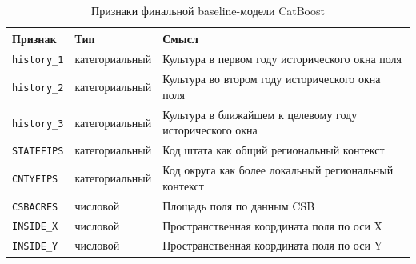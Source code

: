 \begin{table}[htbp]
\centering
\small
\caption{Признаки финальной baseline-модели CatBoost}
\label{tab:practice-final-features}
\begin{tabularx}{0.96\textwidth}{L{0.22\textwidth} L{0.18\textwidth} X}
\toprule
Признак & Тип & Смысл \\
\midrule
\texttt{history\_1} & категориальный & Культура в первом году исторического окна поля \\
\texttt{history\_2} & категориальный & Культура во втором году исторического окна поля \\
\texttt{history\_3} & категориальный & Культура в ближайшем к целевому году исторического окна \\
\texttt{STATEFIPS} & категориальный & Код штата как общий региональный контекст \\
\texttt{CNTYFIPS} & категориальный & Код округа как более локальный региональный контекст \\
\texttt{CSBACRES} & числовой & Площадь поля по данным CSB \\
\texttt{INSIDE\_X} & числовой & Пространственная координата поля по оси X \\
\texttt{INSIDE\_Y} & числовой & Пространственная координата поля по оси Y \\
\bottomrule
\end{tabularx}
\end{table}
